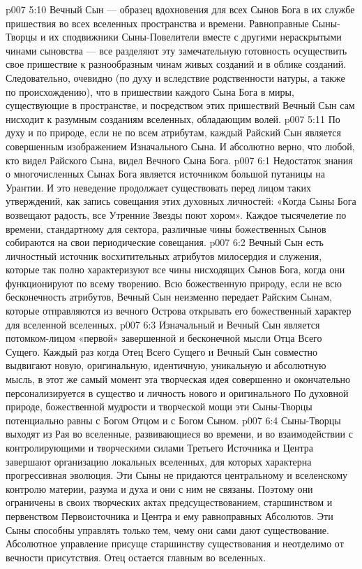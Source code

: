 \vs p007 5:10 \pc Вечный Сын --- образец вдохновения для всех Сынов Бога в их службе пришествия во всех вселенных пространства и времени. Равноправные Сыны\hyp{}Творцы и их сподвижники Сыны\hyp{}Повелители вместе с другими нераскрытыми чинами сыновства --- все разделяют эту замечательную готовность осуществить свое пришествие к разнообразным чинам живых созданий и в облике созданий. Следовательно, очевидно (по духу и вследствие родственности натуры, а также по происхождению), что в пришествии каждого Сына Бога в миры, существующие в пространстве, и посредством этих пришествий Вечный Сын сам нисходит к разумным созданиям вселенных, обладающим волей.
\vs p007 5:11 По духу и по природе, если не по всем атрибутам, каждый Райский Сын является совершенным изображением Изначального Сына. И абсолютно верно, что любой, кто видел Райского Сына, видел Вечного Сына Бога.
\vs p007 6:1 Недостаток знания о многочисленных Сынах Бога является источником большой путаницы на Урантии. И это неведение продолжает существовать перед лицом таких утверждений, как запись совещания этих духовных личностей: «Когда Сыны Бога возвещают радость, все Утренние Звезды поют хором». Каждое тысячелетие по времени, стандартному для сектора, различные чины божественных Сынов собираются на свои периодические совещания.
\vs p007 6:2 Вечный Сын есть личностный источник восхитительных атрибутов милосердия и служения, которые так полно характеризуют все чины нисходящих Сынов Бога, когда они функционируют по всему творению. Всю божественную природу, если не всю бесконечность атрибутов, Вечный Сын неизменно передает Райским Сынам, которые отправляются из вечного Острова открывать его божественный характер для вселенной вселенных.
\vs p007 6:3 \pc Изначальный и Вечный Сын является потомком\hyp{}лицом «первой» завершенной и бесконечной мысли Отца Всего Сущего. Каждый раз когда Отец Всего Сущего и Вечный Сын совместно выдвигают новую, оригинальную, идентичную, уникальную и абсолютную мысль, в этот же самый момент эта творческая идея совершенно и окончательно персонализируется в существо и личность нового и оригинального  По духовной природе, божественной мудрости и творческой мощи эти Сыны\hyp{}Творцы потенциально равны с Богом Отцом и с Богом Сыном.
\vs p007 6:4 Сыны\hyp{}Творцы выходят из Рая во вселенные, развивающиеся во времени, и во взаимодействии с контролирующими и творческими силами Третьего Источника и Центра завершают организацию локальных вселенных, для которых характерна прогрессивная эволюция. Эти Сыны не придаются центральному и вселенскому контролю материи, разума и духа и они с ним не связаны. Поэтому они ограничены в своих творческих актах предсуществованием, старшинством и первенством Первоисточника и Центра и ему равноправных Абсолютов. Эти Сыны способны управлять только тем, чему они сами дают существование. Абсолютное управление присуще старшинству существования и неотделимо от вечности присутствия. Отец остается главным во вселенных.
